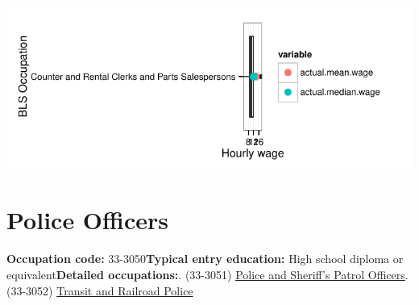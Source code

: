 \documentclass[a4paper,10pt]{article}\usepackage[]{graphicx}\usepackage[]{color}
\makeatletter
\def\maxwidth{ %
  \ifdim\Gin@nat@width>\linewidth
    \linewidth
  \else
    \Gin@nat@width
  \fi
}
\makeatother
\begin{document}
{\centering \includegraphics[width=\maxwidth]{figure/unnamed-chunk-245} 

}


\newpage\section{Police Officers}\textbf{Occupation code:} 33-3050\newline\textbf{Typical entry education:} High school diploma or equivalent\newline\textbf{Detailed occupations:}. (33-3051)  \href{http://www.bls.gov/oes/current/oes333051.htm}{Police and Sheriff's Patrol Officers}. (33-3052)  \href{http://www.bls.gov/oes/current/oes333052.htm}{Transit and Railroad Police}\newline%
\end{document}
